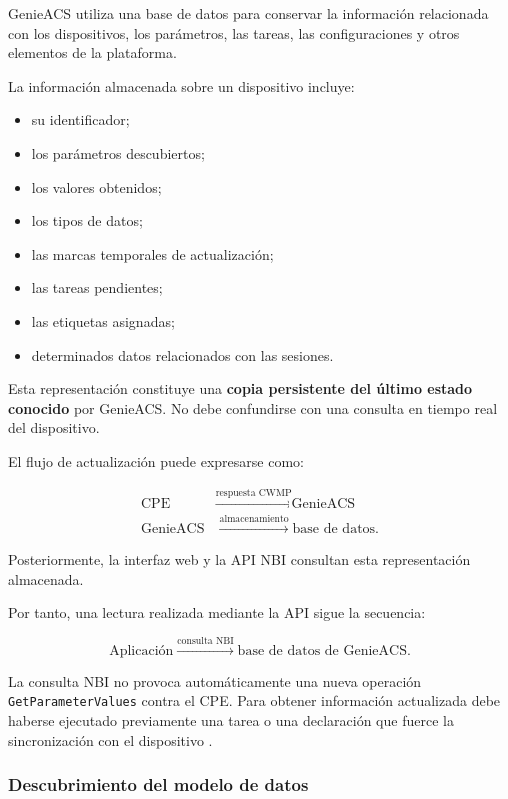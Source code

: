 GenieACS utiliza una base de datos para conservar la información
relacionada con los dispositivos, los parámetros, las tareas, las
configuraciones y otros elementos de la plataforma.

La información almacenada sobre un dispositivo incluye:

\begin{itemize}
    \item su identificador;
    \item los parámetros descubiertos;
    \item los valores obtenidos;
    \item los tipos de datos;
    \item las marcas temporales de actualización;
    \item las tareas pendientes;
    \item las etiquetas asignadas;
    \item determinados datos relacionados con las sesiones.
\end{itemize}

Esta representación constituye una \textbf{copia persistente del último
estado conocido} por GenieACS. No debe confundirse con una consulta en
tiempo real del dispositivo.

El flujo de actualización puede expresarse como:

\[
\begin{aligned}
    \text{CPE}
    &\xrightarrow{\text{respuesta CWMP}}
    \text{GenieACS}\\
    \text{GenieACS}
    &\xrightarrow{\text{almacenamiento}}
    \text{base de datos}.
\end{aligned}
\]

Posteriormente, la interfaz web y la API NBI consultan esta representación
almacenada.

Por tanto, una lectura realizada mediante la API sigue la secuencia:

\[
    \text{Aplicación}
    \xrightarrow{\text{consulta NBI}}
    \text{base de datos de GenieACS}.
\]

La consulta NBI no provoca automáticamente una nueva operación
\texttt{GetParameterValues} contra el CPE. Para obtener información
actualizada debe haberse ejecutado previamente una tarea o una
declaración que fuerce la sincronización con el dispositivo
\cite{genieacs_api}.


\subsubsection*{Descubrimiento del modelo de datos}

